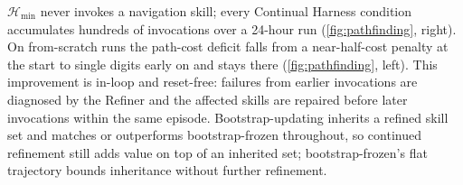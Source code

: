 $\mathcal{H}_{\min}$ never invokes a navigation skill; every Continual Harness condition accumulates hundreds of invocations over a 24-hour run (\cref{fig:pathfinding}, right). On from-scratch runs the path-cost deficit falls from a near-half-cost penalty at the start to single digits early on and stays there (\cref{fig:pathfinding}, left). This improvement is in-loop and reset-free: failures from earlier invocations are diagnosed by the Refiner and the affected skills are repaired before later invocations within the same episode. Bootstrap-updating inherits a refined skill set and matches or outperforms bootstrap-frozen throughout, so continued refinement still adds value on top of an inherited set; bootstrap-frozen's flat trajectory bounds inheritance without further refinement.
